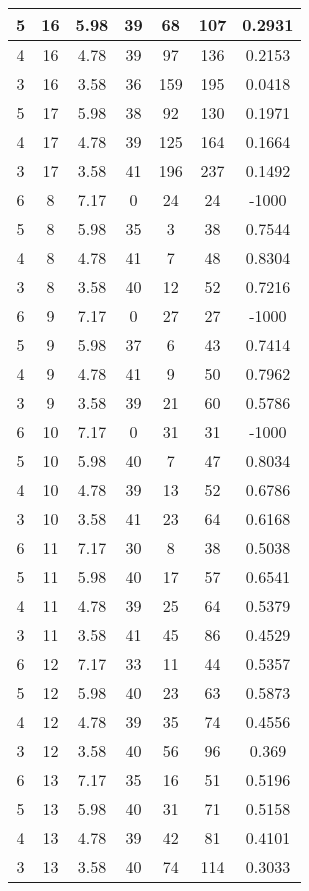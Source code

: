 \documentclass[letterpaper, 12pt]{article}
\begin{document}
\begin{longtable}{|c|c|c|c|c|c|c|}
\hline
5 & 16 & 5.98 & 39 & 68 & 107 & 0.2931 \\
\hline
4 & 16 & 4.78 & 39 & 97 & 136 & 0.2153 \\
\hline
3 & 16 & 3.58 & 36 & 159 & 195 & 0.0418 \\
\hline
5 & 17 & 5.98 & 38 & 92 & 130 & 0.1971 \\
\hline
4 & 17 & 4.78 & 39 & 125 & 164 & 0.1664 \\
\hline
3 & 17 & 3.58 & 41 & 196 & 237 & 0.1492 \\
\hline
6 & 8 & 7.17 & 0 & 24 & 24 & -1000 \\
\hline
5 & 8 & 5.98 & 35 & 3 & 38 & 0.7544 \\
\hline
4 & 8 & 4.78 & 41 & 7 & 48 & 0.8304 \\
\hline
3 & 8 & 3.58 & 40 & 12 & 52 & 0.7216 \\
\hline
6 & 9 & 7.17 & 0 & 27 & 27 & -1000 \\
\hline
5 & 9 & 5.98 & 37 & 6 & 43 & 0.7414 \\
\hline
4 & 9 & 4.78 & 41 & 9 & 50 & 0.7962 \\
\hline
3 & 9 & 3.58 & 39 & 21 & 60 & 0.5786 \\
\hline
6 & 10 & 7.17 & 0 & 31 & 31 & -1000 \\
\hline
5 & 10 & 5.98 & 40 & 7 & 47 & 0.8034 \\
\hline
4 & 10 & 4.78 & 39 & 13 & 52 & 0.6786 \\
\hline
3 & 10 & 3.58 & 41 & 23 & 64 & 0.6168 \\
\hline
6 & 11 & 7.17 & 30 & 8 & 38 & 0.5038 \\
\hline
5 & 11 & 5.98 & 40 & 17 & 57 & 0.6541 \\
\hline
4 & 11 & 4.78 & 39 & 25 & 64 & 0.5379 \\
\hline
3 & 11 & 3.58 & 41 & 45 & 86 & 0.4529 \\
\hline
6 & 12 & 7.17 & 33 & 11 & 44 & 0.5357 \\
\hline
5 & 12 & 5.98 & 40 & 23 & 63 & 0.5873 \\
\hline
4 & 12 & 4.78 & 39 & 35 & 74 & 0.4556 \\
\hline
3 & 12 & 3.58 & 40 & 56 & 96 & 0.369 \\
\hline
6 & 13 & 7.17 & 35 & 16 & 51 & 0.5196 \\
\hline
5 & 13 & 5.98 & 40 & 31 & 71 & 0.5158 \\
\hline
4 & 13 & 4.78 & 39 & 42 & 81 & 0.4101 \\
\hline
3 & 13 & 3.58 & 40 & 74 & 114 & 0.3033 \\

\end{longtable}
\end{document}
